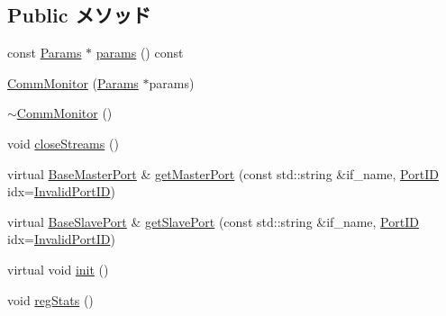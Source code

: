 \subsection*{Public メソッド}
\begin{DoxyCompactItemize}
\item 
const \hyperlink{classCommMonitor_a945848d2cb95179e45fffc6a7f41da84}{Params} $\ast$ \hyperlink{classCommMonitor_acd3c3feb78ae7a8f88fe0f110a718dff}{params} () const 
\item 
\hyperlink{classCommMonitor_af8e768be1328f879d2240d44e6f430e1}{CommMonitor} (\hyperlink{classCommMonitor_a945848d2cb95179e45fffc6a7f41da84}{Params} $\ast$params)
\item 
\hyperlink{classCommMonitor_a47022a49dc532464956ee511797d53e9}{$\sim$CommMonitor} ()
\item 
void \hyperlink{classCommMonitor_a1a9faf3ec2cf5587b9f182041981b72c}{closeStreams} ()
\item 
virtual \hyperlink{classBaseMasterPort}{BaseMasterPort} \& \hyperlink{classCommMonitor_adc4e675e51defbdd1e354dac729d0703}{getMasterPort} (const std::string \&if\_\-name, \hyperlink{base_2types_8hh_acef4d7d41cb21fdc252e20c04cd7bb8e}{PortID} idx=\hyperlink{base_2types_8hh_a65bf40f138cf863f0c5e2d8ca1144126}{InvalidPortID})
\item 
virtual \hyperlink{classBaseSlavePort}{BaseSlavePort} \& \hyperlink{classCommMonitor_ac918a145092d7514ebc6dbd952dceafb}{getSlavePort} (const std::string \&if\_\-name, \hyperlink{base_2types_8hh_acef4d7d41cb21fdc252e20c04cd7bb8e}{PortID} idx=\hyperlink{base_2types_8hh_a65bf40f138cf863f0c5e2d8ca1144126}{InvalidPortID})
\item 
virtual void \hyperlink{classCommMonitor_a02fd73d861ef2e4aabb38c0c9ff82947}{init} ()
\item 
void \hyperlink{classCommMonitor_a4dc637449366fcdfc4e764cdf12d9b11}{regStats} ()
\end{DoxyCompactItemize}
